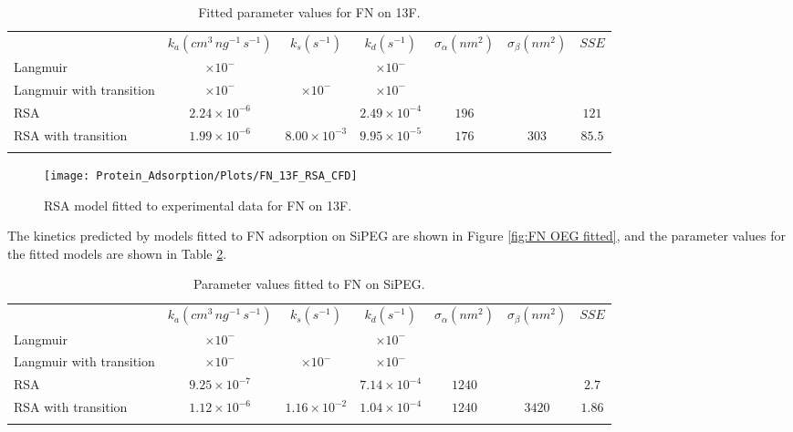 \begin{table}
\caption{\label{tab:FN on 13F}Fitted parameter values for FN on 13F.}
\begin{tabular}{>{\raggedright}p{0.75in}cccccc}
 & $k_{a}\left(cm^{3}\, ng^{-1}\, s^{-1}\right)$ & $k_{s}\left(s^{-1}\right)$ & $k_{d}\left(s^{-1}\right)$ & $\sigma_{\alpha}\left(nm^{2}\right)$ & $\sigma_{\beta}\left(nm^{2}\right)$ & $SSE$\tabularnewline[\doublerulesep]
\cline{2-7} 
\noalign{\vskip\doublerulesep}
Langmuir & $\times10^{-}$ &  & $\times10^{-}$ & $ $ &  & $ $\tabularnewline
Langmuir with transition & $\times10^{-}$ & $\times10^{-}$ & $\times10^{-}$ & $ $ & $ $ & $ $\tabularnewline
\noalign{\vskip\doublerulesep}
RSA & $2.24\times10^{-6}$ &  & $2.49\times10^{-4}$ & $196$ &  & $121$\tabularnewline
\noalign{\vskip\doublerulesep}
RSA with transition & $1.99\times10^{-6}$ & $8.00\times10^{-3}$ & $9.95\times10^{-5}$ & $176$ & $303$ & $85.5$\tabularnewline
\noalign{\vskip\doublerulesep}
\end{tabular}%
\end{table}
%
\begin{figure}
\texttt{[image: Protein\_Adsorption/Plots/FN\_13F\_RSA\_CFD]}

\caption{\label{fig:FN 13F fitted}RSA model fitted to experimental data for
FN on 13F.}
%
\end{figure}
 The kinetics predicted by models fitted to FN adsorption on SiPEG
are shown in Figure \ref{fig:FN OEG fitted}, and the parameter values
for the fitted models are shown in Table \ref{tab:FN OEG fitted params}.%
\begin{table}
\caption{\label{tab:FN OEG fitted params}Parameter values fitted to FN on
SiPEG.}
\begin{tabular}{>{\raggedright}p{0.75in}cccccc}
 & $k_{a}\left(cm^{3}\, ng^{-1}\, s^{-1}\right)$ & $k_{s}\left(s^{-1}\right)$ & $k_{d}\left(s^{-1}\right)$ & $\sigma_{\alpha}\left(nm^{2}\right)$ & $\sigma_{\beta}\left(nm^{2}\right)$ & $SSE$\tabularnewline[\doublerulesep]
\cline{2-7} 
\noalign{\vskip\doublerulesep}
Langmuir & $\times10^{-}$ &  & $\times10^{-}$ & $ $ &  & $ $\tabularnewline
Langmuir with transition & $\times10^{-}$ & $\times10^{-}$ & $\times10^{-}$ & $ $ & $ $ & $ $\tabularnewline
\noalign{\vskip\doublerulesep}
RSA & $9.25\times10^{-7}$ &  & $7.14\times10^{-4}$ & $1240$ &  & $2.7$\tabularnewline
\noalign{\vskip\doublerulesep}
RSA with transition & $1.12\times10^{-6}$ & $1.16\times10^{-2}$ & $1.04\times10^{-4}$ & $1240$ & $3420$ & $1.86$\tabularnewline
\noalign{\vskip\doublerulesep}
\end{tabular}%
\end{table}
